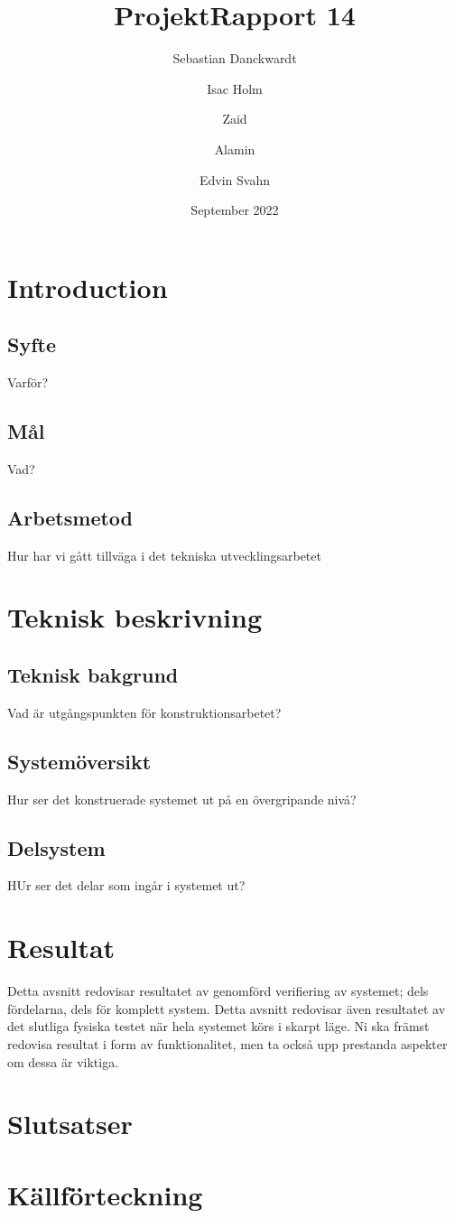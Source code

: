 \documentclass{article}
\title{ProjektRapport 14}
\author{Sebastian Danckwardt \and Isac Holm \and Zaid \and Alamin \and Edvin Svahn}
\date{September 2022}
\begin{document}
\maketitle

\section{Introduction}
\subsection{Syfte}
Varför?
\subsection{Mål}
Vad?
\subsection{Arbetsmetod}
Hur har vi gått tillväga i det tekniska utvecklingsarbetet
\section{Teknisk beskrivning}
\subsection{Teknisk bakgrund}
Vad är utgångspunkten för konstruktionsarbetet?
\subsection{Systemöversikt}
Hur ser det konstruerade systemet ut på en övergripande nivå?
\subsection{Delsystem}
HUr ser det delar som ingår i systemet ut?
\section{Resultat}
Detta avsnitt redovisar resultatet av genomförd verifiering av systemet; dels fördelarna, dels för 
komplett system. Detta avsnitt redovisar även resultatet av det slutliga fysiska testet när hela systemet 
körs i skarpt läge. Ni ska främst redovisa resultat i form av funktionalitet, men ta också upp prestanda 
aspekter om dessa är viktiga.  
\section{Slutsatser}
\section{Källförteckning}
\end{document}
